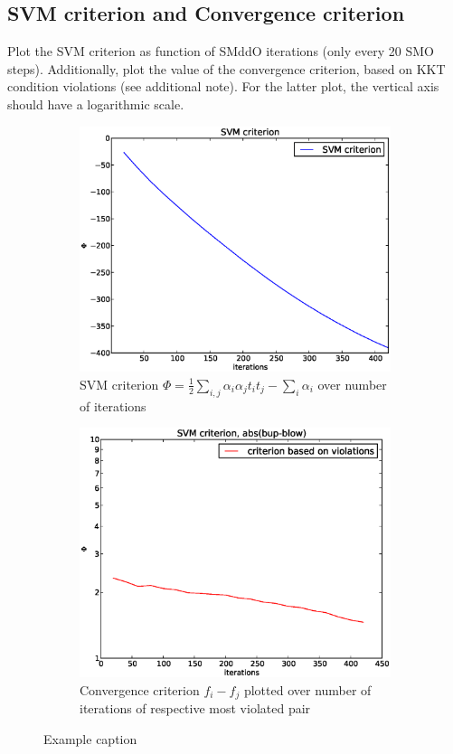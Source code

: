 \subsection{SVM criterion and Convergence criterion}
Plot the SVM criterion as function of SMddO iterations (only
every 20 SMO steps). Additionally, plot the value of the convergence criterion,
based on KKT condition violations (see additional note). For the latter plot,
the vertical axis should have a logarithmic scale.
\begin{figure}[!ht]
	\centering
	\begin{subfigure}[b]{.45\textwidth}
	\centering
	\includegraphics[width=\textwidth]{svm/svm_criterion.eps}
	\caption{SVM criterion $\Phi = \frac{1}{2}\sum_{i,j}\alpha_i\alpha_j t_i t_j -\sum_i \alpha_i$ over number of iterations}
	\end{subfigure}
	\quad
	\begin{subfigure}[b]{.45\textwidth}
	\centering
	\includegraphics[width=\textwidth]{svm/criterion_violations_plot.eps}
	\caption{Convergence criterion $f_i-f_j$ plotted over number of iterations of respective most violated pair}
	\end{subfigure}
	\caption{Example caption}
	\label{fig:svm_criterion}
\end{figure}

